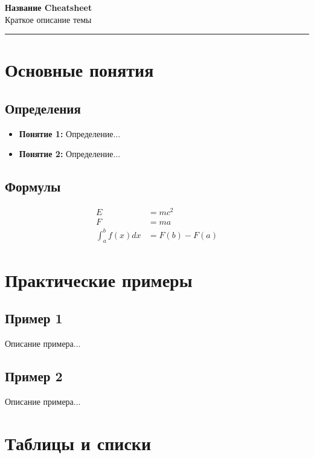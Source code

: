 \documentclass[10pt,landscape,a4paper]{article}
\begin{document}
\begin{center}
    {\Huge\bfseries Название Cheatsheet}\\[0.5cm]
    {\large Краткое описание темы}\\[0.3cm]
    \rule{\textwidth}{1pt}
\end{center}

\begin{multicols}{2}

\section{Основные понятия}

\subsection{Определения}
\begin{itemize}
    \item \textbf{Понятие 1:} Определение...
    \item \textbf{Понятие 2:} Определение...
\end{itemize}

\subsection{Формулы}
\begin{align}
    E &= mc^2 \\
    F &= ma \\
    \int_a^b f(x) dx &= F(b) - F(a)
\end{align}

\section{Практические примеры}

\subsection{Пример 1}
Описание примера...

\subsection{Пример 2}
Описание примера...

\section{Таблицы и списки}


\end{multicols}
\end{document}
